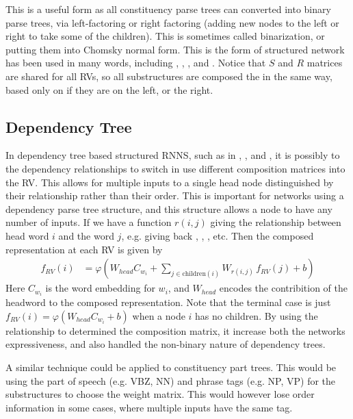 \documentclass[12pt,parskip]{komatufte}
\begin{document}
This is a useful form as all constituency parse trees can converted into binary parse trees, via left-factoring or right factoring (adding new nodes to the left or right to take some of the children).
This is sometimes called binarization, or putting them into  Chomsky normal form.
This is the form of structured network has been used in many words, including , \textcite{SocherEtAl2011:RAE},  \textcite{SocherEtAl2011:PoolRAE},
 \textcite{Socher2011ParsingPhrases} and \textcite{zhang2014BRAE}.
Notice that $S$ and $R$ matrices are shared for all RVs, so all substructures are composed the in the same way, based only on if they are on the left, or the right.

\subsection{Dependency Tree}
In dependency tree based structured RNNS, such as in , , and ,
it is possibly to the dependency relationships to switch in use different composition matrices into the RV.
This allows for multiple inputs to a single head node distinguished by their relationship rather than their order.
This is important for networks using a dependency parse tree structure, and this structure allows a node to have any number of inputs.
If we have a function $r(i,j)$ giving the relationship between head word $i$ and the word $j$, e.g. giving back , , ,  etc.
Then the composed representation at each RV is given by 
\begin{align}
	f_{RV}(i) &= \varphi\left(W_{head} C_{w_i} + \sum_{j \in \mathrm{children}(i)} W_{r(i,j)} \, f_{RV}(j) + b \right)
\end{align}
Here $C_{w_i}$ is the word embedding for $w_i$, and $W_{head}$ encodes the contribition of the headword to the composed representation.
Note that the terminal case is just $f_{RV}(i) = \varphi \left( W_{head} C_{w_i} + b \right)$ when a node $i$ has no children.
By using the relationship to determined the composition matrix, it increase both the networks expressiveness, and also handled the non-binary nature of dependency trees.


A similar technique could be applied to constituency part trees.
This would be using the part of speech (e.g. VBZ, NN) and phrase tags (e.g. NP, VP) for the substructures to choose the weight matrix.
This would however lose order information in some cases, where multiple inputs have the same tag.
\end{document}
